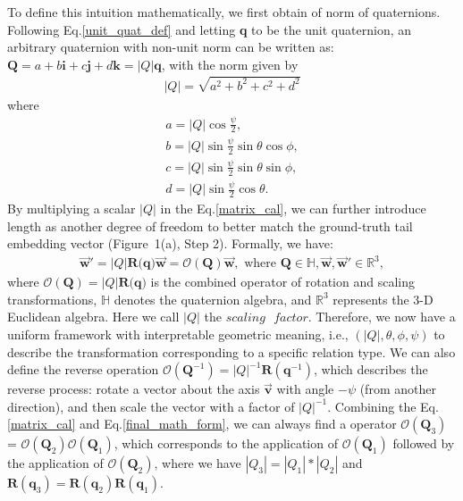 \documentclass[11pt]{article}
\begin{document}
To define this intuition mathematically, we first obtain of norm of quaternions. Following Eq.\ref{unit_quat_def} and letting \textbf{q} to be the unit quaternion, an arbitrary quaternion with non-unit norm can be written as: \(\textbf{Q} = a + b\textbf{i} + c\textbf{j} + d\textbf{k} = |Q|\textbf{q}\), with the norm given by
\begin{equation}
\begin{aligned}
|Q| = \sqrt{a^2+b^2+c^2+d^2}
\end{aligned}
\end{equation}
\noindent where 
\begin{equation}
\begin{gathered}
a=|Q|\cos{\frac{\psi}{2}}, \\ b=|Q|\sin{\frac{\psi}{2}}\sin{\theta}\cos{\phi},\\ c=|Q|\sin{\frac{\psi}{2}}\sin{\theta}\sin{\phi}, \\
d=|Q|\sin{\frac{\psi}{2}}\cos{\theta}.
\end{gathered}
\end{equation}
By multiplying a scalar \(|Q|\) in the Eq.\ref{matrix_cal}, we can further introduce length as another degree of freedom to better match the ground-truth tail embedding vector (Figure~1(a), Step 2). Formally, we have:
\begin{equation}
\begin{aligned}
\overrightarrow{\boldsymbol{w}}' = |Q|\textbf{R(q)}\overrightarrow{\boldsymbol{w}} = \mathcal{O}(\textbf{Q})\overrightarrow{\boldsymbol{w}}, \text{ where } \textbf{Q} \in \mathbb{H}, \overrightarrow{\boldsymbol{w}}, \overrightarrow{\boldsymbol{w}}' \in \mathbb{R}^{3},
\label{final_math_form}
\end{aligned}
\end{equation}
\noindent where \(\mathcal{O}(\textbf{Q}) = |Q|\textbf{R(q)}\) is the combined operator of rotation and scaling transformations, \(\mathbb{H}\) denotes the quaternion algebra, and \(\mathbb{R}^{3}\) represents the 3-D Euclidean algebra. Here we call \(|Q|\) the \(scaling \text{ } factor\). Therefore, we now have a uniform framework with  interpretable geometric meaning, i.e., \((|Q|, \theta, \phi, \psi)\) to describe the transformation corresponding to a specific relation type.
We can also define the reverse operation \(\mathcal{O}(\textbf{Q}^{-1}) = |Q|^{-1}\textbf{R}(\textbf{q}^{-1})\), which describes the reverse process: rotate a vector about the axis \(\overrightarrow{\boldsymbol{v}}\) with angle \(-\psi\) (from another direction), and then scale the vector with a factor of \(|Q|^{-1}\). Combining the Eq.\ref{matrix_cal} and Eq.\ref{final_math_form}, we can always find a operator \(\mathcal{O}(\textbf{Q}_3)\) = \(\mathcal{O}(\textbf{Q}_2)\mathcal{O}(\textbf{Q}_1)\), which corresponds to the application of \(\mathcal{O}(\textbf{Q}_1)\) followed by the application of \(\mathcal{O}(\textbf{Q}_2)\), where we have \(|Q_3| = |Q_1|*|Q_2|\) and \(\textbf{R}(\textbf{q}_3) = \textbf{R}(\textbf{q}_2)\textbf{R}(\textbf{q}_1)\).
\end{document}
